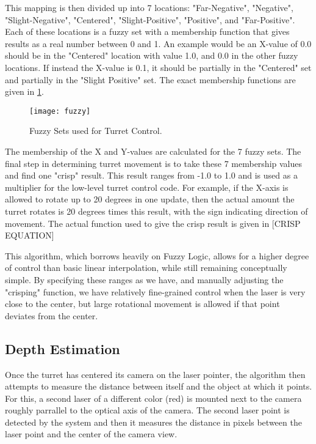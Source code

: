 \documentclass[10pt,twocolumn,letterpaper]{article}
\begin{document}
This mapping is then divided up into 7 locations:  "Far-Negative", "Negative", "Slight-Negative", "Centered", "Slight-Positive", "Positive", and "Far-Positive". Each of these locations is a fuzzy set with a membership function that gives results as a real number between 0 and 1. An example would be an X-value of 0.0 should be in the "Centered" location with value 1.0, and 0.0 in the other fuzzy locations. If instead the X-value is 0.1, it should be partially in the "Centered" set and partially in the "Slight Positive" set. The exact membership functions are given in \ref{fig:fuzzy}.

\begin{figure}[t]
\begin{center}
  \texttt{[image: fuzzy]}
\end{center}
   \caption{Fuzzy Sets used for Turret Control.}
\label{fig:fuzzy}
\end{figure}

The membership of the X and Y-values are calculated for the 7 fuzzy sets. The final step in determining turret movement is to take these 7 membership values and find one "crisp" result. This result ranges from -1.0 to 1.0 and is used as a multiplier for the low-level turret control code. For example, if the X-axis is allowed to rotate up to 20 degrees in one update, then the actual amount the turret rotates is 20 degrees times this result, with the sign indicating direction of movement. The actual function used to give the crisp result is given in [CRISP EQUATION]

This algorithm, which borrows heavily on Fuzzy Logic, allows for a higher degree of control than basic linear interpolation, while still remaining conceptually simple. By specifying these ranges as we have, and manually adjusting the "crisping" function, we have relatively fine-grained control when the laser is very close to the center, but large rotational movement is allowed if that point deviates from the center.

\subsection{Depth Estimation}

Once the turret has centered its camera on the laser pointer, the algorithm then attempts to measure the distance between itself and the object at which it points.  For this, a second laser of a different color (red) is mounted next to the camera roughly parrallel to the optical axis of the camera.  The second laser point is detected by the system and then it measures the distance in pixels between the laser point and the center of the camera view. 
\end{document}

